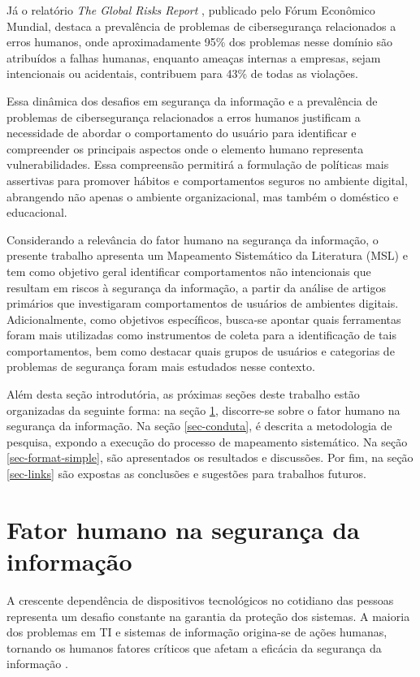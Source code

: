 \documentclass[portuguese]{textolivre}
\begin{document}
Já o relatório\textit{ The Global Risks Report} \cite{world_economic_forum_wef_global_2022}, publicado pelo Fórum Econômico Mundial, destaca a prevalência de problemas de cibersegurança relacionados a erros humanos, onde aproximadamente 95\% dos problemas nesse domínio são atribuídos a falhas humanas, enquanto ameaças internas a empresas, sejam intencionais ou acidentais, contribuem para 43\% de todas as violações.

Essa dinâmica dos desafios em segurança da informação e a prevalência de problemas de cibersegurança relacionados a erros humanos justificam a necessidade de abordar o comportamento do usuário para identificar e compreender os principais aspectos onde o elemento humano representa vulnerabilidades. Essa compreensão permitirá a formulação de políticas mais assertivas para promover hábitos e comportamentos seguros no ambiente digital, abrangendo não apenas o ambiente organizacional, mas também o doméstico e educacional.

Considerando a relevância do fator humano na segurança da informação, o presente trabalho apresenta um Mapeamento Sistemático da Literatura (MSL) e tem como objetivo geral identificar comportamentos não intencionais que resultam em riscos à segurança da informação, a partir da análise de artigos primários que investigaram comportamentos de usuários de ambientes digitais.
Adicionalmente, como objetivos específicos, busca-se apontar quais ferramentas foram mais utilizadas como instrumentos de coleta para a identificação de tais comportamentos, bem como destacar quais grupos de usuários e categorias de problemas de segurança foram mais estudados nesse contexto.

Além desta seção introdutória, as próximas seções deste trabalho estão organizadas da seguinte forma: na seção \ref{sec-normas}, discorre-se sobre o fator humano na segurança da informação. Na seção \ref{sec-conduta}, é descrita a metodologia de pesquisa, expondo a execução do processo de mapeamento sistemático. Na seção \ref{sec-format-simple}, são apresentados os resultados e discussões. Por fim, na seção \ref{sec-links} são expostas as conclusões e sugestões para trabalhos futuros.

\section{Fator humano na segurança da informação}\label{sec-normas}
A crescente dependência de dispositivos tecnológicos no cotidiano das pessoas representa um desafio constante na garantia da proteção dos sistemas. A maioria dos problemas em TI e sistemas de informação origina-se de ações humanas, tornando os humanos fatores críticos que afetam a eficácia da segurança da informação \cite{safianu_information_2016}.
\end{document}

